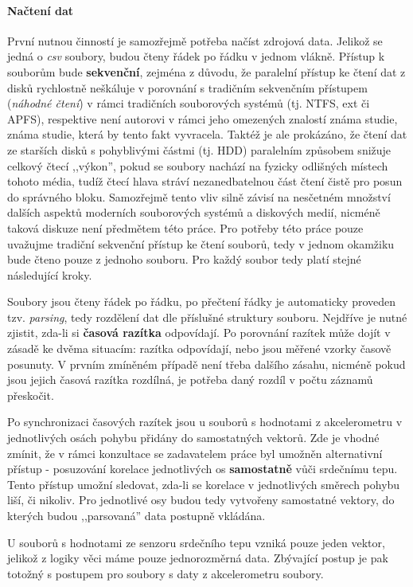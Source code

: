 \documentclass[12pt, a4paper]{article}
\begin{document}
\paragraph{Načtení dat} První nutnou činností je samozřejmě potřeba načíst zdrojová data. 
Jelikož se jedná o \textit{csv} soubory, budou čteny řádek po řádku v jednom vlákně. 
Přístup k souborům bude \textbf{sekvenční}, zejména z důvodu, že paralelní přístup ke čtení dat z disků rychlostně neškáluje v porovnání s tradičním sekvenčním přístupem (\textit{náhodné čtení}) v rámci tradičních souborových systémů (tj. NTFS, ext či APFS), respektive není autorovi v rámci jeho omezených znalostí známa studie, známa studie, která by tento fakt vyvracela.
Taktéž je ale prokázáno, že čtení dat ze starších disků s pohyblivými částmi (tj. HDD) paralelním způsobem snižuje celkový čtecí ,,výkon'', pokud se soubory nachází na fyzicky odlišných místech tohoto média, tudíž čtecí hlava stráví nezanedbatelnou část čtení čistě pro posun do správného bloku.
Samozřejmě tento vliv silně závisí na nesčetném množství dalších aspektů moderních souborových systémů a diskových medií, nicméně taková diskuze není předmětem této práce. 
Pro potřeby této práce pouze uvažujme tradiční sekvenční přístup ke čtení souborů, tedy v jednom okamžiku bude čteno pouze z jednoho souboru.
Pro každý soubor tedy platí stejné následující kroky. 

Soubory jsou čteny řádek po řádku, po přečtení řádky je automaticky proveden tzv. \textit{parsing}, tedy rozdělení dat dle příslušné struktury souboru.
Nejdříve je nutné zjistit, zda-li si \textbf{časová razítka} odpovídají.
Po porovnání razítek může dojít v zásadě ke dvěma situacím: razítka odpovídají, nebo jsou měřené vzorky časově posunuty.
V prvním zmíněném případě není třeba dalšího zásahu, nicméně pokud jsou jejich časová razítka rozdílná, je potřeba daný rozdíl v počtu záznamů přeskočit.

Po synchronizaci časových razítek jsou u souborů s hodnotami z akcelerometru v jednotlivých osách pohybu přidány do samostatných vektorů.
Zde je vhodné zmínit, že v rámci konzultace se zadavatelem práce byl umožněn alternativní přístup - posuzování korelace jednotlivých os \textbf{samostatně} vůči srdečnímu tepu.
Tento přístup umožní sledovat, zda-li se korelace v jednotlivých směrech pohybu liší, či nikoliv. 
Pro jednotlivé osy budou tedy vytvořeny samostatné vektory, do kterých budou ,,parsovaná'' data postupně vkládána.

U souborů s hodnotami ze senzoru srdečního tepu vzniká pouze jeden vektor, jelikož z logiky věci máme pouze jednorozměrná data. 
Zbývající postup je pak totožný s postupem pro soubory s daty z akcelerometru soubory.
\end{document}
